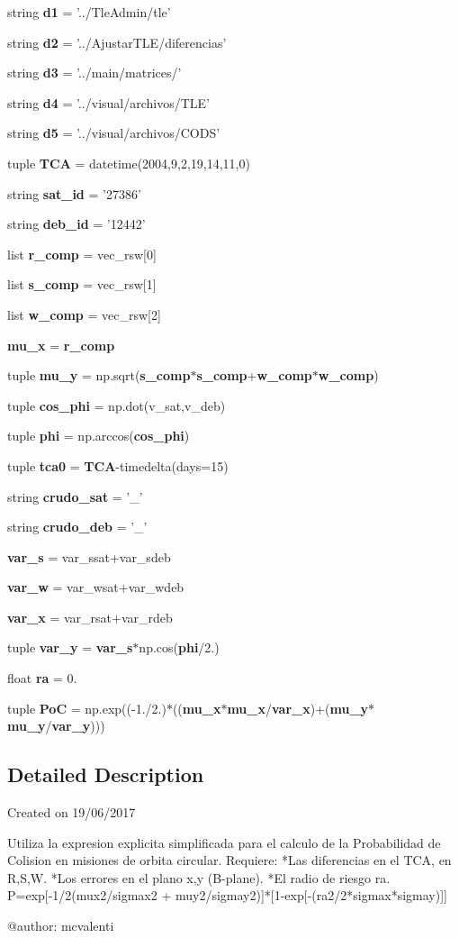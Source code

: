 \begin{DoxyCompactItemize}
\item 
string {\bf d1} = '../\-Tle\-Admin/tle'
\item 
string {\bf d2} = '../\-Ajustar\-T\-L\-E/diferencias'
\item 
string {\bf d3} = '../main/matrices/'
\item 
string {\bf d4} = '../visual/archivos/\-T\-L\-E'
\item 
string {\bf d5} = '../visual/archivos/\-C\-O\-D\-S'
\item 
tuple {\bf \-T\-C\-A} = datetime(2004,9,2,19,14,11,0)
\item 
string {\bf sat\-\_\-id} = '27386'
\item 
string {\bf deb\-\_\-id} = '12442'
\item 
list {\bf r\-\_\-comp} = vec\-\_\-rsw[0]
\item 
list {\bf s\-\_\-comp} = vec\-\_\-rsw[1]
\item 
list {\bf w\-\_\-comp} = vec\-\_\-rsw[2]
\item 
{\bf mu\-\_\-x} = {\bf r\-\_\-comp}
\item 
tuple {\bf mu\-\_\-y} = np.\-sqrt({\bf s\-\_\-comp}$\ast${\bf s\-\_\-comp}+{\bf w\-\_\-comp}$\ast${\bf w\-\_\-comp})
\item 
tuple {\bf cos\-\_\-phi} = np.\-dot(v\-\_\-sat,v\-\_\-deb)
\item 
tuple {\bf phi} = np.\-arccos({\bf cos\-\_\-phi})
\item 
tuple {\bf tca0} = {\bf \-T\-C\-A}-\/timedelta(days=15)
\item 
string {\bf crudo\-\_\-sat} = '\-\_\-'
\item 
string {\bf crudo\-\_\-deb} = '\-\_\-'
\item 
{\bf var\-\_\-s} = var\-\_\-ssat+var\-\_\-sdeb
\item 
{\bf var\-\_\-w} = var\-\_\-wsat+var\-\_\-wdeb
\item 
{\bf var\-\_\-x} = var\-\_\-rsat+var\-\_\-rdeb
\item 
tuple {\bf var\-\_\-y} = {\bf var\-\_\-s}$\ast$np.\-cos({\bf phi}/2.)
\item 
float {\bf ra} = 0.
\item 
tuple {\bf \-Po\-C} = np.\-exp((-\/1./2.)$\ast$(({\bf mu\-\_\-x}$\ast${\bf mu\-\_\-x}/{\bf var\-\_\-x})+({\bf mu\-\_\-y}$\ast${\bf mu\-\_\-y}/{\bf var\-\_\-y})))
\end{DoxyCompactItemize}


\subsection{\-Detailed \-Description}
\begin{DoxyVerb}
Created on 19/06/2017

Utiliza la expresion explicita simplificada para el calculo
de la Probabilidad de Colision en misiones de orbita circular.
Requiere: 
*Las diferencias en el TCA, en R,S,W. 
*Los errores en el plano x,y (B-plane).
*El radio de riesgo ra.
P=exp[-1/2(mux2/sigmax2 + muy2/sigmay2)]*[1-exp[-(ra2/2*sigmax*sigmay)]]

@author: mcvalenti
\end{DoxyVerb}
 

